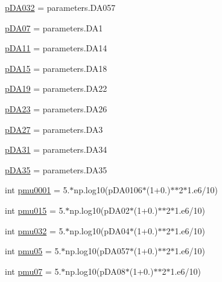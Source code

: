 \begin{DoxyCompactItemize}
\mbox{\hyperlink{namespaceconstraints__BDE__mu__rBAO_a2729045bdadddac6d0513e31fdc8432a}{p\+D\+A032}} = parameters.\+D\+A057
\item 
\mbox{\hyperlink{namespaceconstraints__BDE__mu__rBAO_a5877f1158ffe6c3e5fc2803e0b354cbe}{p\+D\+A07}} = parameters.\+D\+A1
\item 
\mbox{\hyperlink{namespaceconstraints__BDE__mu__rBAO_a72c284b813b051427d7e79d37951f8ed}{p\+D\+A11}} = parameters.\+D\+A14
\item 
\mbox{\hyperlink{namespaceconstraints__BDE__mu__rBAO_a4970dc40a3419b7469f6876e5f4e16a4}{p\+D\+A15}} = parameters.\+D\+A18
\item 
\mbox{\hyperlink{namespaceconstraints__BDE__mu__rBAO_a1bc2e1d5453121517344d4564f701775}{p\+D\+A19}} = parameters.\+D\+A22
\item 
\mbox{\hyperlink{namespaceconstraints__BDE__mu__rBAO_a96a18d043c22a07ec953cb7d5a3bbea1}{p\+D\+A23}} = parameters.\+D\+A26
\item 
\mbox{\hyperlink{namespaceconstraints__BDE__mu__rBAO_aefcae6ff20e90b1dd0a4563374987460}{p\+D\+A27}} = parameters.\+D\+A3
\item 
\mbox{\hyperlink{namespaceconstraints__BDE__mu__rBAO_a9926b2f8e062d90854450c1c0b28f31b}{p\+D\+A31}} = parameters.\+D\+A34
\item 
\mbox{\hyperlink{namespaceconstraints__BDE__mu__rBAO_a7b3ef4245807b4bb1d6a1130dae80eb9}{p\+D\+A35}} = parameters.\+D\+A35
\item 
int \mbox{\hyperlink{namespaceconstraints__BDE__mu__rBAO_a1f6665441b519f71c36a83bb093003c3}{pmu0001}} = 5.$\ast$np.\+log10(p\+D\+A0106$\ast$(1+0.)$\ast$$\ast$2$\ast$1.e6/10)
\item 
int \mbox{\hyperlink{namespaceconstraints__BDE__mu__rBAO_ad1dc8c5e91013bfbd60054789b83c36f}{pmu015}} = 5.$\ast$np.\+log10(p\+D\+A02$\ast$(1+0.)$\ast$$\ast$2$\ast$1.e6/10)
\item 
int \mbox{\hyperlink{namespaceconstraints__BDE__mu__rBAO_aeea4635f48090b6e52b70fabfece65d1}{pmu032}} = 5.$\ast$np.\+log10(p\+D\+A04$\ast$(1+0.)$\ast$$\ast$2$\ast$1.e6/10)
\item 
int \mbox{\hyperlink{namespaceconstraints__BDE__mu__rBAO_a61394c9775dc9871e3ecfddaf3987754}{pmu05}} = 5.$\ast$np.\+log10(p\+D\+A057$\ast$(1+0.)$\ast$$\ast$2$\ast$1.e6/10)
\item 
int \mbox{\hyperlink{namespaceconstraints__BDE__mu__rBAO_a1b1445787695b7df4634beac36d8f65d}{pmu07}} = 5.$\ast$np.\+log10(p\+D\+A08$\ast$(1+0.)$\ast$$\ast$2$\ast$1.e6/10)
\item 
$$
\end{DoxyCompactItemize}

